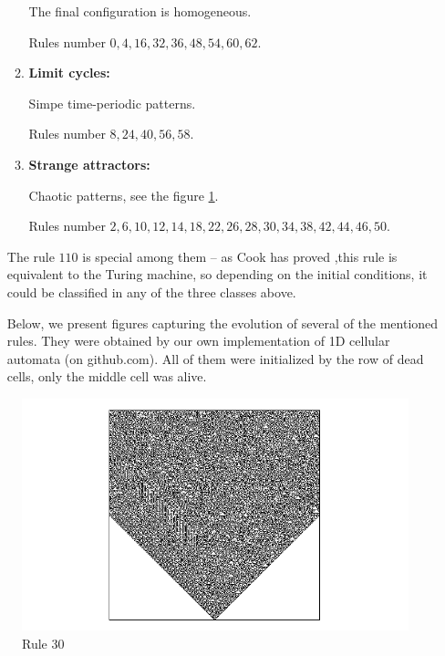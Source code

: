 \begin{enumerate}
\begin{enumerate}
The final configuration is homogeneous. 

Rules number $0,4,16,32,36,48,54,60,62$.

\item \textbf{Limit cycles:}

Simpe time-periodic patterns. 

Rules number $8,24,40,56,58$.

\item \textbf{Strange attractors:}

Chaotic patterns, see the figure \ref{rule30}. 

Rules number $2,6,10,12,14,18,22,26,28,30,34,38,42,44,46,50$.

%
%
%
\end{enumerate}
The rule $110$ is special among them -- as Cook has proved \cite{cook},this rule is equivalent to the Turing machine, so depending on the initial conditions, it could be classified in any of the three classes above.

Below, we present figures capturing the evolution of several of the mentioned rules.
They were obtained by our own implementation of 1D cellular automata (on github.com).
All of them were initialized by the row of dead cells, only the middle cell was alive.

\end{enumerate}

\begin{figure}[!t]
 \centering
 \includegraphics[trim = 40mm 0mm 0mm 0mm, width=1.7\textwidth]{./img/30_500}
 \caption{Rule 30}
 \label{rule30}
\end{figure}

